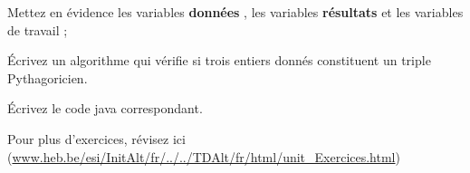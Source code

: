 \documentclass[11pt,a4paper]{article}
\begin{document}
            \par
        
          Mettez en \'evidence les variables \textbf{\guillemotleft  donn\'ees \guillemotright }, 
          les variables \textbf{\guillemotleft  r\'esultats \guillemotright } et les variables de travail ;
        
            \par
        
          \'Ecrivez un algorithme qui v\'erifie si trois entiers donn\'es constituent un triple Pythagoricien.
        
            \par
        \'Ecrivez le code java correspondant.
            \par
        Pour plus d'exercices, 
        r\'evisez ici (\url{www.heb.be/esi/InitAlt/fr/../../TDAlt/fr/html/unit\_Exercices.html})
            \par
        
				
\end{document}
